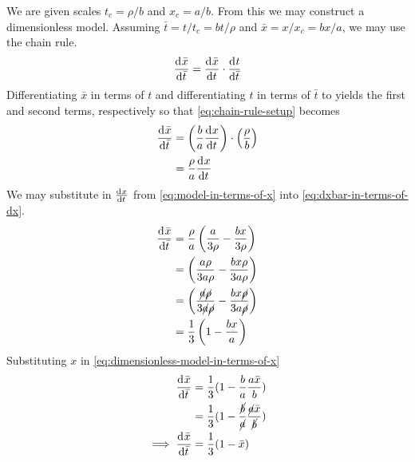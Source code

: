 \documentclass[12pt,twoside]{article}
\begin{document}
We are given scales $t_c=\rho/b$ and $x_c=a/b$. From this we may construct a
dimensionless model. Assuming $\bar{t}=t/t_c=bt/\rho$ and $\bar{x}=x/x_c=bx/a$, we may use
the chain rule.
\begin{equation}
  \label{eq:chain-rule-setup}
  \frac{\mathrm{d}^{} {\bar{x}}}{\mathrm{d}{\bar{t}}^{}} = \frac{\mathrm{d}^{} {\bar{x}}}{\mathrm{d}{t}^{}} \cdot \frac{\mathrm{d}^{} {t}}{\mathrm{d}{\bar{t}}^{}}
\end{equation}
Differentiating $\bar{x}$ in terms of $t$ and differentiating $t$ in terms of
$\bar{t}$ to yields the first and second terms, respectively so that
\cref{eq:chain-rule-setup} becomes
\begin{equation}
  \label{eq:dxbar-in-terms-of-dx}
  \begin{aligned}
    \frac{\mathrm{d}^{} {\bar{x}}}{\mathrm{d}{\bar{t}}^{}} &= \left(\frac{b}{a}\frac{\mathrm{d}^{} {x}}{\mathrm{d}{t}^{}}\right)\cdot\left(\frac{\rho}{b}\right) \\
    &= \frac{\rho}{a}\frac{\mathrm{d}^{} {x}}{\mathrm{d}{t}^{}} \\
  \end{aligned}
\end{equation}
We may substitute in $\frac{\mathrm{d}^{} {x}}{\mathrm{d}{t}^{}}$ from \cref{eq:model-in-terms-of-x} into
\cref{eq:dxbar-in-terms-of-dx}.
\begin{equation}
  \label{eq:dimensionless-model-in-terms-of-x}
  \begin{aligned}
    \frac{\mathrm{d}^{} {\bar{x}}}{\mathrm{d}{\bar{t}}^{}} &= \frac{\rho}{a}\left(\frac{a}{3\rho} -
    \frac{bx}{3\rho}\right) \\ &= \left(\frac{a\rho}{3a\rho} -
    \frac{bx\rho}{3a\rho}\right) \\
    &= \left(\frac{\cancel{a}\cancel{\rho}}{3\cancel{a}\cancel{\rho}} -
    \frac{bx\cancel{\rho}}{3a\cancel{\rho}}\right) \\
    &= \frac{1}{3}\left(1-\frac{bx}{a}\right) \\
  \end{aligned}
\end{equation}
Substituting $x$ in \cref{eq:dimensionless-model-in-terms-of-x}
\begin{equation}
  \label{eq:dimensionless-model-in-terms-of-x-bar}
  \begin{aligned}
    \frac{\mathrm{d}^{} {\bar{x}}}{\mathrm{d}{\bar{t}}^{}} &= \frac{1}{3}(1-\frac{b}{a}\frac{a\bar{x}}{b}) \\
    &=
    \frac{1}{3}(1-\frac{\cancel{b}}{\cancel{a}}\frac{\cancel{a}\bar{x}}{\cancel{b}})
    \\
    \implies \frac{\mathrm{d}^{} {\bar{x}}}{\mathrm{d}{\bar{t}}^{}} &= \frac{1}{3}(1-\bar{x}) \\
  \end{aligned}
\end{equation}
\end{document}
